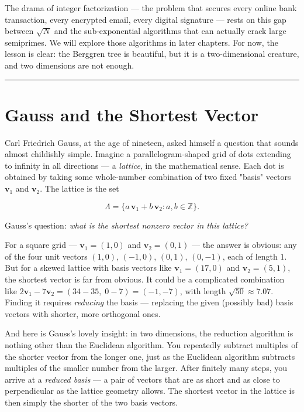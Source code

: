 \documentclass[11pt,openany]{book}
\theoremstyle{definition}
\theoremstyle{plain}
\theoremstyle{remark}
\begin{document}
The drama of integer factorization — the problem that secures every online bank transaction, every encrypted email, every digital signature — rests on this gap between $\sqrt{N}$ and the sub-exponential algorithms that can actually crack large semiprimes. We will explore those algorithms in later chapters. For now, the lesson is clear: the Berggren tree is beautiful, but it is a two-dimensional creature, and two dimensions are not enough.

\bigskip\noindent\rule{\textwidth}{0.4pt}\bigskip


\section*{Gauss and the Shortest Vector}


Carl Friedrich Gauss, at the age of nineteen, asked himself a question that sounds almost childishly simple. Imagine a parallelogram-shaped grid of dots extending to infinity in all directions — a \textit{lattice}, in the mathematical sense. Each dot is obtained by taking some whole-number combination of two fixed "basis" vectors $\mathbf{v}_1$ and $\mathbf{v}_2$. The lattice is the set

\[
\Lambda = \{a\,\mathbf{v}_1 + b\,\mathbf{v}_2 : a, b \in \mathbb{Z}\}.
\]


Gauss's question: \textit{what is the shortest nonzero vector in this lattice?}

For a square grid — $\mathbf{v}_1 = (1, 0)$ and $\mathbf{v}_2 = (0, 1)$ — the answer is obvious: any of the four unit vectors $(1,0)$, $(-1,0)$, $(0,1)$, $(0,-1)$, each of length $1$. But for a skewed lattice with basis vectors like $\mathbf{v}_1 = (17, 0)$ and $\mathbf{v}_2 = (5, 1)$, the shortest vector is far from obvious. It could be a complicated combination like $2\mathbf{v}_1 - 7\mathbf{v}_2 = (34 - 35,\; 0 - 7) = (-1, -7)$, with length $\sqrt{50} \approx 7.07$. Finding it requires \textit{reducing} the basis — replacing the given (possibly bad) basis vectors with shorter, more orthogonal ones.

And here is Gauss's lovely insight: in two dimensions, the reduction algorithm is nothing other than the Euclidean algorithm. You repeatedly subtract multiples of the shorter vector from the longer one, just as the Euclidean algorithm subtracts multiples of the smaller number from the larger. After finitely many steps, you arrive at a \textit{reduced basis} — a pair of vectors that are as short and as close to perpendicular as the lattice geometry allows. The shortest vector in the lattice is then simply the shorter of the two basis vectors.
\end{document}
